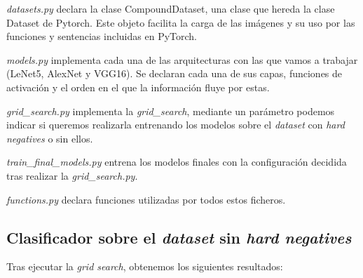 \noindent \textit{datasets.py} declara la clase CompoundDataset, una clase que hereda la clase Dataset de Pytorch. Este objeto facilita la carga de las imágenes y su uso por las funciones y sentencias incluidas en PyTorch.

\noindent \textit{models.py} implementa cada una de las arquitecturas con las que vamos a trabajar (LeNet5, AlexNet y VGG16). Se declaran cada una de sus capas, funciones de activación y el orden en el que la información fluye por estas.

\noindent \textit{grid\_search.py} implementa la \textit{grid\_search}, mediante un parámetro podemos indicar si queremos realizarla entrenando los modelos sobre el \textit{dataset} con \textit{hard negatives} o sin ellos.

\noindent \textit{train\_final\_models.py} entrena los modelos finales con la configuración decidida tras realizar la \textit{grid\_search.py}.

\noindent \textit{functions.py} declara funciones utilizadas por todos estos ficheros.

\newpage
\subsection{Clasificador sobre el \textit{dataset} sin \textit{hard negatives}}
Tras ejecutar la \textit{grid search}, obtenemos los siguientes resultados:

